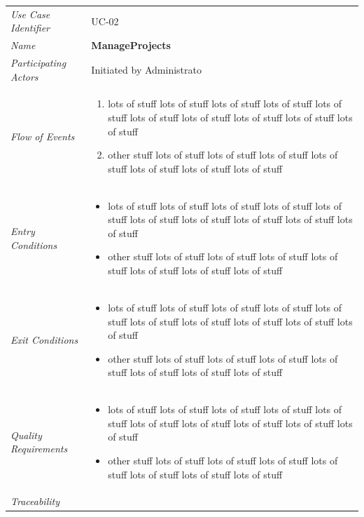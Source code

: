 \documentclass[12pt,letterpaper]{article}
\begin{document}
\begin{center}
    \begin{tabu} to 
        \toprule
		Use Case Identifier & UC-02 \\
		Name & {\bf ManageProjects} \\
        Participating Actors & Initiated by Administrato \\
		Flow of Events & 
	    \begin{enumerate}[topsep=-1em]
		    \item lots of stuff lots of stuff lots of stuff lots of stuff lots of stuff lots of stuff lots of stuff lots of stuff lots of stuff lots of stuff
		    \item other stuff lots of stuff lots of stuff lots of stuff lots of stuff lots of stuff lots of stuff lots of stuff
		\end{enumerate} \\

		Entry Conditions &
		\begin{itemize}[topsep=-1em]
		    \item lots of stuff lots of stuff lots of stuff lots of stuff lots of stuff lots of stuff lots of stuff lots of stuff lots of stuff lots of stuff
		    \item other stuff lots of stuff lots of stuff lots of stuff lots of stuff lots of stuff lots of stuff lots of stuff
        \end{itemize} \\

		Exit Conditions &
		\begin{itemize}[topsep=-1em]
		    \item lots of stuff lots of stuff lots of stuff lots of stuff lots of stuff lots of stuff lots of stuff lots of stuff lots of stuff lots of stuff
		    \item other stuff lots of stuff lots of stuff lots of stuff lots of stuff lots of stuff lots of stuff lots of stuff
        \end{itemize} \\

		Quality Requirements &
		\begin{itemize}[topsep=-1em]
		    \item lots of stuff lots of stuff lots of stuff lots of stuff lots of stuff lots of stuff lots of stuff lots of stuff lots of stuff lots of stuff
		    \item other stuff lots of stuff lots of stuff lots of stuff lots of stuff lots of stuff lots of stuff lots of stuff
        \end{itemize} \\

		Traceability & \\
        \toprule
    \end{tabu}
\end{center}
\end{document}
